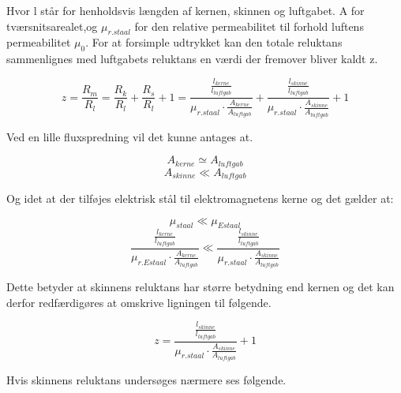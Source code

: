 Hvor l står for henholdsvis længden af kernen, skinnen og luftgabet. A for tværsnitsarealet,og $ \mu_{r.staal} $ for den relative permeabilitet til forhold luftens permeabilitet $\mu_0$.  For at forsimple udtrykket kan den totale reluktans sammenlignes med luftgabets reluktans en værdi  der fremover bliver kaldt z.

\begin{equation}
z = \frac{R_m}{R_l} = \frac{R_k}{R_l} +\frac{R_s}{R_l} + 1 = \frac{
\frac{l_{kerne}}{l_{luftgab}} }
	{\mu_{r.staal} \cdot \frac{A_{kerne}}{A_{luftgab}} }
+
\frac{
	\frac{l_{skinne}}{l_{luftgab}} }
{\mu_{r.staal} \cdot \frac{A_{skinne}}{A_{luftgab}} }
+ 1
\end{equation}

Ved en lille fluxspredning vil det kunne antages at.

\begin{equation}
A_{kerne} \simeq A_{luftgab}
\end{equation}
\begin{equation}
A_{skinne} \ll A_{luftgab}
\end{equation}

Og idet at der tilføjes elektrisk stål til elektromagnetens kerne og det gælder at:

\begin{equation}
\mu_{staal} \ll \mu_{Estaal}
\end{equation}
\begin{equation}
  \frac{\frac{l_{kerne}}{l_{luftgab}}}{
  	{\mu_{r.Estaal} \cdot \frac{A_{kerne}}{A_{luftgab}} }} \ll \frac{
	\frac{l_{skinne}}{l_{luftgab}} }
{\mu_{r.staal} \cdot \frac{A_{skinne}}{A_{luftgab}} }
\end{equation}

Dette betyder at skinnens reluktans har større betydning end kernen og det kan derfor redfærdigøres at omskrive ligningen til følgende.

\begin{equation}
z =
\frac{
	\frac{l_{skinne}}{l_{luftgab}} }
{\mu_{r.staal} \cdot \frac{A_{skinne}}{A_{luftgab}} }
+ 1
\end{equation}

Hvis skinnens reluktans undersøges nærmere ses følgende.


